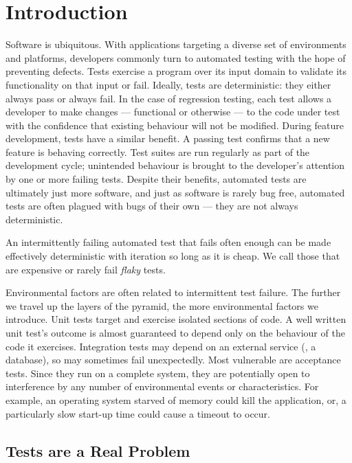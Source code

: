 \section{Introduction}
\label{sec:intro}

Software is ubiquitous. With applications targeting a diverse set of
environments and platforms, developers commonly turn to automated testing with
the hope of preventing defects. Tests exercise a program over its input domain
to validate its functionality on that input or fail. Ideally, tests are
deterministic: they either always pass or always fail. In the case of regression
testing, each test allows a developer to make changes --- functional or
otherwise --- to the code under test with the confidence that existing behaviour
will not be modified. During feature development, tests have a similar benefit.
A passing test confirms that a new feature is behaving correctly. Test suites
are run regularly as part of the development cycle; unintended behaviour is
brought to the developer's attention by one or more failing tests. Despite their
benefits, automated tests are ultimately just more software, and just as
software is rarely bug free, automated tests are often plagued with bugs of
their own --- they are not always deterministic.

An intermittently failing automated test that fails often enough can be made
effectively deterministic with iteration so long as it is cheap. We call those
that are expensive or rarely fail \emph{flaky} tests.

Environmental factors are often related to intermittent test failure. The
further we travel up the layers of the pyramid, the more environmental factors
we introduce. Unit tests target and exercise isolated sections of code. A well
written unit test's outcome is almost guaranteed to depend only on the behaviour
of the code it exercises. Integration tests may depend on an external service
(\eg, a database), so may sometimes fail unexpectedly. Most vulnerable are
acceptance tests. Since they run on a complete system, they are potentially open
to interference by any number of environmental events or characteristics. For
example, an operating system starved of memory could kill the application, or, a
particularly slow start-up time could cause a timeout to occur.

\subsection{\Flaky Tests are a Real Problem}

